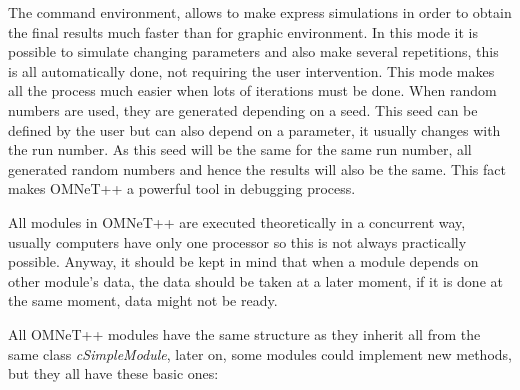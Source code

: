 The command environment, allows to make express simulations in order to obtain the final results much faster than for graphic environment. In this 
mode it is possible to simulate changing parameters and also make several repetitions, this is all automatically done, not requiring the user intervention.
This mode makes all the process much easier when lots of iterations must be done. When random numbers are used, they are generated depending on a seed. 
This seed can be defined by the user but can also depend on a parameter, it usually changes with the run number. As this seed will be the same for the
same run number, all generated random numbers and hence the results will also be the same. This fact makes \ac{OMNeT++} a powerful tool in debugging 
process.

All modules in \ac{OMNeT++} are executed theoretically in a concurrent way, usually computers have only one processor so this is not always
practically possible. Anyway, it should be kept in mind that when a module depends on other module's data, the data should be taken at a 
later moment, if it is done at the same moment, data might not be ready.

All \ac{OMNeT++} modules have the same structure as they inherit all from the same class \textit{cSimpleModule}, later on, some modules could 
implement new methods, but they all have these basic ones:

